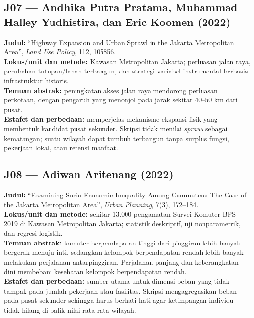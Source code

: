 \documentclass[
  indonesian,
  11pt,
  a4paper,
  oneside,
  openany]{report}
\begin{document}
\subsection{J07 --- Andhika Putra Pratama, Muhammad Halley Yudhistira,
dan Eric Koomen
(2022)}\label{j07-andhika-putra-pratama-muhammad-halley-yudhistira-dan-eric-koomen-2022}

\textbf{Judul:}
\href{https://doi.org/10.1016/j.landusepol.2021.105856}{``Highway
Expansion and Urban Sprawl in the Jakarta Metropolitan Area''},
\emph{Land Use Policy}, 112, 105856.\\
\textbf{Lokus/unit dan metode:} Kawasan Metropolitan Jakarta; perluasan
jalan raya, perubahan tutupan/lahan terbangun, dan strategi variabel
instrumental berbasis infrastruktur historis.\\
\textbf{Temuan abstrak:} peningkatan akses jalan raya mendorong
perluasan perkotaan, dengan pengaruh yang menonjol pada jarak sekitar
40--50 km dari pusat.\\
\textbf{Estafet dan perbedaan:} memperjelas mekanisme ekspansi fisik
yang membentuk kandidat pusat sekunder. Skripsi tidak menilai
\emph{sprawl} sebagai kematangan; suatu wilayah dapat tumbuh terbangun
tanpa surplus fungsi, pekerjaan lokal, atau retensi manfaat.

\subsection{J08 --- Adiwan Aritenang
(2022)}\label{j08-adiwan-aritenang-2022}

\textbf{Judul:} \href{https://doi.org/10.17645/up.v7i3.5271}{``Examining
Socio-Economic Inequality Among Commuters: The Case of the Jakarta
Metropolitan Area''}, \emph{Urban Planning}, 7(3), 172--184.\\
\textbf{Lokus/unit dan metode:} sekitar 13.000 pengamatan Survei Komuter
BPS 2019 di Kawasan Metropolitan Jakarta; statistik deskriptif, uji
nonparametrik, dan regresi logistik.\\
\textbf{Temuan abstrak:} komuter berpendapatan tinggi dari pinggiran
lebih banyak bergerak menuju inti, sedangkan kelompok berpendapatan
rendah lebih banyak melakukan perjalanan antarpinggiran. Perjalanan
panjang dan keberangkatan dini membebani kesehatan kelompok
berpendapatan rendah.\\
\textbf{Estafet dan perbedaan:} sumber utama untuk dimensi beban yang
tidak tampak pada jumlah pekerjaan atau fasilitas. Skripsi
mengagregasikan beban pada pusat sekunder sehingga harus berhati-hati
agar ketimpangan individu tidak hilang di balik nilai rata-rata wilayah.
\end{document}
